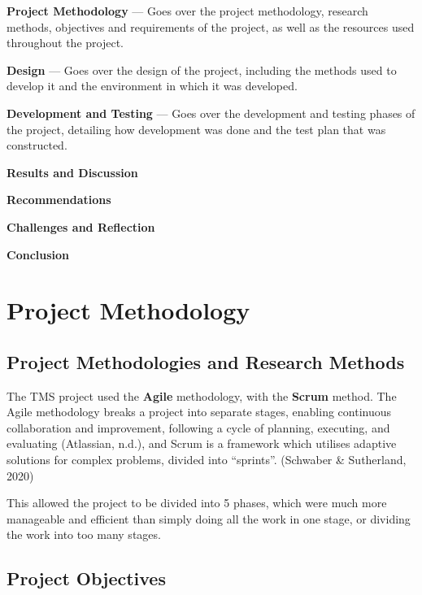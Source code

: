 \documentclass[12pt]{report}
\begin{document}
\textbf{Project Methodology} --- Goes over the project methodology, research
methods, objectives and requirements of the project, as well as the resources
used throughout the project.

\textbf{Design} --- Goes over the design of the project, including the
methods used to develop it and the environment in which it was developed.

\textbf{Development and Testing} --- Goes over the development and testing
phases of the project, detailing how development was done and the test plan
that was constructed.

\textbf{Results and Discussion}

\textbf{Recommendations}

\textbf{Challenges and Reflection}

\textbf{Conclusion}

\section{Project Methodology}

\subsection{Project Methodologies and Research Methods}

The TMS project used the \textbf{Agile} methodology, with the \textbf{Scrum}
method. The Agile methodology breaks a project into separate stages, enabling
continuous collaboration and improvement, following a cycle of planning,
executing, and evaluating (Atlassian, n.d.), and Scrum is a framework
which utilises adaptive solutions for complex problems, divided into
``sprints''. (Schwaber \& Sutherland, 2020)

This allowed the project to be divided into 5 phases, which were much more
manageable and efficient than simply doing all the work in one stage, or
dividing the work into too many stages.

\subsection{Project Objectives}
\end{document}
